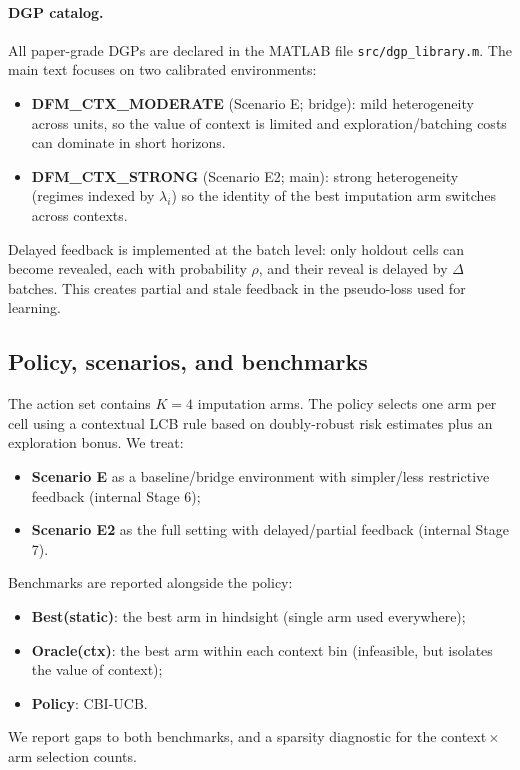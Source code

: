 \paragraph{DGP catalog.}
All paper-grade DGPs are declared in the MATLAB file \texttt{src/dgp\_library.m}. The main text focuses on two calibrated environments:
\begin{itemize}
\item \textbf{DFM\_CTX\_MODERATE} (Scenario E; bridge): mild heterogeneity across units, so the value of context is limited and exploration/batching costs can dominate in short horizons.
\item \textbf{DFM\_CTX\_STRONG} (Scenario E2; main): strong heterogeneity (regimes indexed by $\lambda_i$) so the identity of the best imputation arm switches across contexts.
\end{itemize}

Delayed feedback is implemented at the batch level: only holdout cells can become revealed, each with probability $\rho$, and their reveal is delayed by $\Delta$ batches. This creates partial and stale feedback in the pseudo-loss used for learning.

\subsection{Policy, scenarios, and benchmarks}
The action set contains $K=4$ imputation arms. The policy selects one arm per cell using a contextual LCB rule based on doubly-robust risk estimates plus an exploration bonus. We treat:
\begin{itemize}
\item \textbf{Scenario E} as a baseline/bridge environment with simpler/less restrictive feedback (internal Stage 6);
\item \textbf{Scenario E2} as the full setting with delayed/partial feedback (internal Stage 7).
\end{itemize}

Benchmarks are reported alongside the policy:
\begin{itemize}
\item \textbf{Best(static)}: the best arm in hindsight (single arm used everywhere);
\item \textbf{Oracle(ctx)}: the best arm within each context bin (infeasible, but isolates the value of context);
\item \textbf{Policy}: \textsc{CBI-UCB}.
\end{itemize}
We report gaps to both benchmarks, and a sparsity diagnostic for the context\,$\times$\,arm selection counts.

